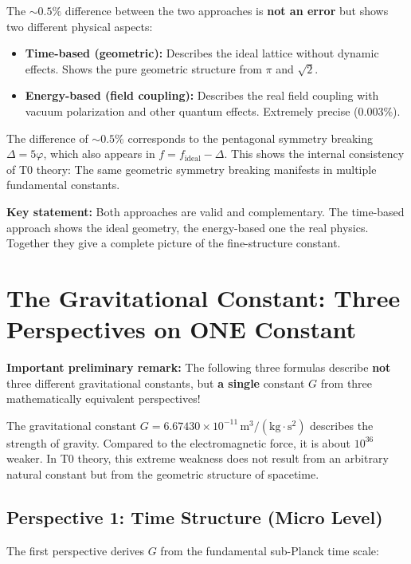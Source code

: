 	The \(\sim0.5\%\) difference between the two approaches is \textbf{not an error} but shows two different physical aspects:
	
	\begin{itemize}
		\item \textbf{Time-based (geometric):} Describes the ideal lattice without dynamic effects. Shows the pure geometric structure from \(\pi\) and \(\sqrt{2}\).
		
		\item \textbf{Energy-based (field coupling):} Describes the real field coupling with vacuum polarization and other quantum effects. Extremely precise (0.003\%).
	\end{itemize}
	
	The difference of \(\sim0.5\%\) corresponds to the pentagonal symmetry breaking \(\Delta = 5\varphi\), which also appears in \(f = f_{\text{ideal}} - \Delta\). This shows the internal consistency of T0 theory: The same geometric symmetry breaking manifests in multiple fundamental constants.
	
	\textbf{Key statement:} Both approaches are valid and complementary. The time-based approach shows the ideal geometry, the energy-based one the real physics. Together they give a complete picture of the fine-structure constant.
	
	\section{The Gravitational Constant: Three Perspectives on ONE Constant}
	
	\textbf{Important preliminary remark:} The following three formulas describe \textbf{not} three different gravitational constants, but \textbf{a single} constant \(G\) from three mathematically equivalent perspectives!
	
	The gravitational constant \(G = 6.67430 \times 10^{-11}\,\text{m}^3/(\text{kg} \cdot \text{s}^2)\) describes the strength of gravity. Compared to the electromagnetic force, it is about \(10^{36}\) weaker. In T0 theory, this extreme weakness does not result from an arbitrary natural constant but from the geometric structure of spacetime.
	
	\subsection{Perspective 1: Time Structure (Micro Level)}
	
	The first perspective derives \(G\) from the fundamental sub-Planck time scale:
	
